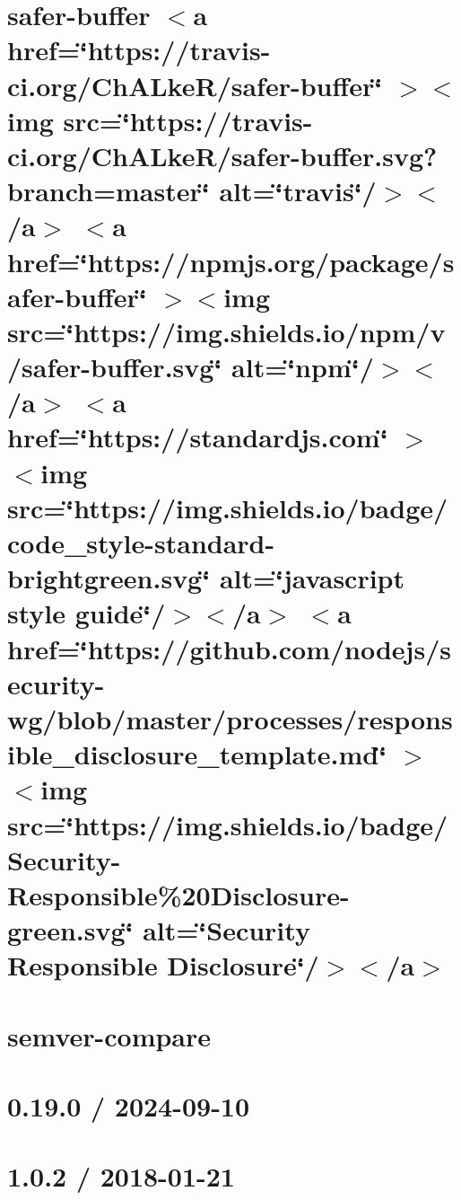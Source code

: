 \documentclass[twoside]{book}
\newcommand{\+}{\discretionary{\mbox{\scriptsize$\hookleftarrow$}}{}{}}
\begin{document}
\chapter{safer-\/buffer \texorpdfstring{$<$}{<}a href=\char`\"{}https\+://travis-\/ci.\+org/\+Ch\+ALke\+R/safer-\/buffer\char`\"{} \texorpdfstring{$>$}{>}\texorpdfstring{$<$}{<}img src=\char`\"{}https\+://travis-\/ci.\+org/\+Ch\+ALke\+R/safer-\/buffer.\+svg?branch=master\char`\"{} alt=\char`\"{}travis\char`\"{}/\texorpdfstring{$>$}{>}\texorpdfstring{$<$}{<}/a\texorpdfstring{$>$}{>} \texorpdfstring{$<$}{<}a href=\char`\"{}https\+://npmjs.\+org/package/safer-\/buffer\char`\"{} \texorpdfstring{$>$}{>}\texorpdfstring{$<$}{<}img src=\char`\"{}https\+://img.\+shields.\+io/npm/v/safer-\/buffer.\+svg\char`\"{} alt=\char`\"{}npm\char`\"{}/\texorpdfstring{$>$}{>}\texorpdfstring{$<$}{<}/a\texorpdfstring{$>$}{>} \texorpdfstring{$<$}{<}a href=\char`\"{}https\+://standardjs.\+com\char`\"{} \texorpdfstring{$>$}{>}\texorpdfstring{$<$}{<}img src=\char`\"{}https\+://img.\+shields.\+io/badge/code\+\_\+style-\/standard-\/brightgreen.\+svg\char`\"{} alt=\char`\"{}javascript style guide\char`\"{}/\texorpdfstring{$>$}{>}\texorpdfstring{$<$}{<}/a\texorpdfstring{$>$}{>} \texorpdfstring{$<$}{<}a href=\char`\"{}https\+://github.\+com/nodejs/security-\/wg/blob/master/processes/responsible\+\_\+disclosure\+\_\+template.\+md\char`\"{} \texorpdfstring{$>$}{>}\texorpdfstring{$<$}{<}img src=\char`\"{}https\+://img.\+shields.\+io/badge/\+Security-\/\+Responsible\%20\+Disclosure-\/green.\+svg\char`\"{} alt=\char`\"{}\+Security Responsible Disclosure\char`\"{}/\texorpdfstring{$>$}{>}\texorpdfstring{$<$}{<}/a\texorpdfstring{$>$}{>}}
\label{md_src_nodejs_node_modules_safer_buffer_Readme}

\chapter{semver-\/compare}
\label{md_src_nodejs_node_modules_semver_compare_readme}

\chapter{0.19.0 / 2024-\/09-\/10}
\label{md_src_nodejs_node_modules_send_HISTORY}

\chapter{1.0.2 / 2018-\/01-\/21}
\label{md_src_nodejs_node_modules_send_node_modules_encodeurl_HISTORY}

\end{document}
